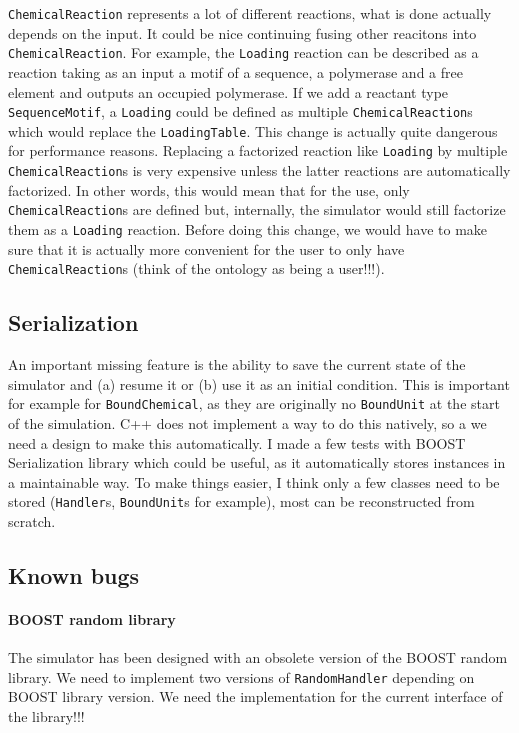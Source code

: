 \texttt{ChemicalReaction} represents a lot of different reactions, what is done actually depends on the input. It could be nice continuing fusing other reacitons into \texttt{ChemicalReaction}. For example, the \texttt{Loading} reaction can be described as a reaction taking as an input a motif of a sequence, a polymerase and a free element and outputs an occupied polymerase. If we add a reactant type \texttt{SequenceMotif}, a \texttt{Loading} could be defined as multiple \texttt{ChemicalReaction}s which would replace the \texttt{LoadingTable}. This change is actually quite dangerous for performance reasons. Replacing a factorized reaction like \texttt{Loading} by multiple \texttt{ChemicalReaction}s is very expensive unless the latter reactions are automatically factorized. In other words, this would mean that for the use, only \texttt{ChemicalReaction}s are defined but, internally, the simulator would still factorize them as a \texttt{Loading} reaction. Before doing this change, we would have to make sure that it is actually more convenient for the user to only have \texttt{ChemicalReaction}s (think of the ontology as being a user!!!).

\subsection{Serialization}

An important missing feature is the ability to save the current state of the simulator and (a) resume it or (b) use it as an initial condition. This is important for example for \texttt{BoundChemical}, as they are originally no \texttt{BoundUnit} at the start of the simulation. C++ does not implement a way to do this natively, so a we need a design to make this automatically. I made a few tests with BOOST Serialization library which could be useful, as it automatically stores instances in a maintainable way. To make things easier, I think only a few classes need to be stored (\texttt{Handler}s, \texttt{BoundUnit}s for example), most can be reconstructed from scratch.

\subsection{Known bugs}

\paragraph{BOOST random library} The simulator has been designed with an obsolete version of the BOOST random library. We need to implement two versions of \texttt{RandomHandler} depending on BOOST library version. We need the implementation for the current interface of the library!!!

